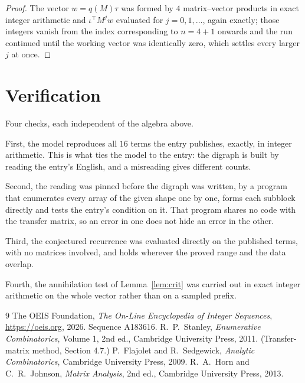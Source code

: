 \documentclass[11pt,a4paper]{article}
\theoremstyle{plain}
\theoremstyle{definition}
\begin{document}
\begin{proof}
The vector $w=q(M)\tau$ was formed by $4$ matrix--vector products in exact integer
arithmetic and $\iota^{\!\top}M^{j}w$ evaluated for $j=0,1,\dots$, again exactly; those
integers vanish from the index corresponding to $n=4+1$ onwards and the run continued
until the working vector was identically zero, which settles every larger $j$ at once.
\end{proof}

\section{Verification}

Four checks, each independent of the algebra above.

First, the model reproduces all $16$ terms the entry publishes, exactly, in integer
arithmetic. This is what ties the model to the entry: the digraph is built by reading the
entry's English, and a misreading gives different counts.

Second, the reading was pinned before the digraph was written, by a program that enumerates
every array of the given shape one by one, forms each subblock directly and tests the entry's
condition on it. That program shares no code with the transfer matrix, so an error in one does
not hide an error in the other.

Third, the conjectured recurrence was evaluated directly on the published terms, with no
matrices involved, and holds wherever the proved range and the data overlap.

Fourth, the annihilation test of Lemma~\ref{lem:crit} was carried out in exact integer
arithmetic on the whole vector rather than on a sampled prefix.

\begin{thebibliography}{9}
 The OEIS Foundation, \emph{The On-Line Encyclopedia of Integer
Sequences}, \url{https://oeis.org}, 2026. Sequence A183616.
 R.~P.~Stanley, \emph{Enumerative Combinatorics}, Volume 1, 2nd ed.,
Cambridge University Press, 2011. (Transfer-matrix method, Section 4.7.)
 P.~Flajolet and R.~Sedgewick, \emph{Analytic Combinatorics}, Cambridge
University Press, 2009.
 R.~A.~Horn and C.~R.~Johnson, \emph{Matrix Analysis}, 2nd ed., Cambridge
University Press, 2013.
\end{thebibliography}
\end{document}
